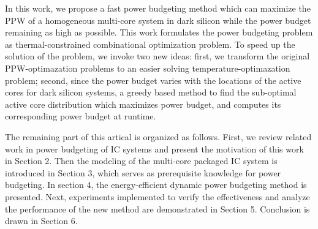In this work, we propose a fast power budgeting method which can maximize the PPW of a homogeneous multi-core system in dark silicon while the power budget remaining as high as possible. This work formulates the power budgeting problem as thermal-constrained combinational optimization problem. To speed up the solution of the problem, we invoke two new ideas: first, we transform the original PPW-optimazation problems to an easier solving temperature-optimazation problem; second, since the power budget varies with the locations of the active cores for dark silicon systems, a greedy based method to find the sub-optimal active core distribution which maximizes power budget, and computes its corresponding power budget at runtime.

The remaining part of this artical is organized as follows. First, we review related work in power budgeting of IC systems and present the motivation of this work in Section 2. Then the modeling of the multi-core packaged IC system is introduced in Section 3, which serves as prerequisite knowledge for power budgeting. In section 4, the energy-efficient dynamic power budgeting method is presented. Next, experiments implemented to verify the effectiveness and analyze the performance of the new method are demonstrated in Section 5. Conclusion is drawn in Section 6.